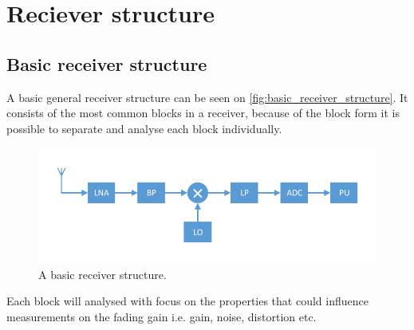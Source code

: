 \chapter{Reciever structure}

\section{Basic receiver structure}

A basic general receiver structure can be seen on \autoref{fig:basic_receiver_structure}. It consists of the most common blocks in a receiver, because of the block form it is possible to separate and analyse each block individually. 

\begin{figure}[H]
\centering
\includegraphics[width= \textwidth]{figures/Receiver.pdf}
\caption{A basic receiver structure.}
\label{fig:basic_receiver_structure}
\end{figure}

Each block will analysed with focus on the properties that could influence measurements on the fading gain i.e. gain, noise, distortion etc.

